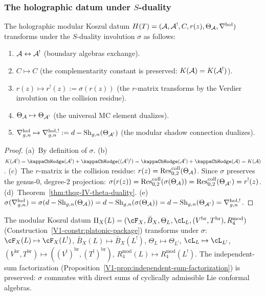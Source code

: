 \subsubsection{The holographic datum under $S$-duality}

\begin{proposition}
\label{prop:thqg-IV-holographic-datum}
The holographic modular Koszul datum
$H(T) = (\mathcal{A}, \mathcal{A}^!, C, r(z), \Theta_{\mathcal{A}}, \nabla^{\mathrm{hol}})$
transforms under the $S$-duality involution $\sigma$ as follows:
\begin{enumerate}[label=\textup{(\alph*)}]
\item $\mathcal{A} \leftrightarrow \mathcal{A}^!$ (boundary algebras exchange).
\item $C \mapsto C$ (the complementarity constant is preserved:
 $K(\mathcal{A}) = K(\mathcal{A}^!)$).
\item $r(z) \mapsto r^!(z) := \sigma(r(z))$ (the $r$-matrix
 transforms by the Verdier involution on the collision residue).
\item $\Theta_{\mathcal{A}} \mapsto \Theta_{\mathcal{A}^!}$ (the universal MC element
 dualizes).
\item $\nabla^{\mathrm{hol}}_{g,n} \mapsto \nabla^{\mathrm{hol},!}_{g,n}
 := d - \mathrm{Sh}_{g,n}(\Theta_{\mathcal{A}^!})$ (the modular shadow connection
 dualizes).
\end{enumerate}
\end{proposition}

\begin{proof}
(a)~By definition of $\sigma$.
(b)~$K(\cA^!) = \kappaChHodge(\cA^!) + \kappaChHodge((\cA^!)^!) = \kappaChHodge(\cA^!) + \kappaChHodge(\cA) = K(\cA)$.
(c)~The $r$-matrix is the collision residue:
$r(z) = \operatorname{Res}^{\mathrm{coll}}_{0,2}(\Theta_{\mathcal{A}})$.
Since $\sigma$ preserves the genus-$0$, degree-$2$ projection:
$\sigma(r(z)) = \operatorname{Res}^{\mathrm{coll}}_{0,2}(\sigma(\Theta_{\mathcal{A}}))
= \operatorname{Res}^{\mathrm{coll}}_{0,2}(\Theta_{\mathcal{A}^!}) = r^!(z)$.
(d)~Theorem~\ref{thm:thqg-IV-theta-duality}.
(e)~$\sigma(\nabla^{\mathrm{hol}}_{g,n})
= \sigma(d - \mathrm{Sh}_{g,n}(\Theta_{\mathcal{A}}))
= d - \mathrm{Sh}_{g,n}(\sigma(\Theta_{\mathcal{A}}))
= d - \mathrm{Sh}_{g,n}(\Theta_{\mathcal{A}^!})
= \nabla^{\mathrm{hol},!}_{g,n}$.
\end{proof}

\begin{remark}
The modular Koszul datum $\Pi_X(L) = (\cF_X, \bar{B}_X, \Theta_L, \cL_L,
(V^{\mathrm{br}}, T^{\mathrm{br}}), R_4^{\mathrm{mod}})$
(Construction~\ref{V1-constr:platonic-package}) transforms under $\sigma$:
$\cF_X(L) \mapsto \cF_X(L^!)$,
$\bar{B}_X(L) \mapsto \bar{B}_X(L^!)$,
$\Theta_L \mapsto \Theta_{L^!}$,
$\cL_L \mapsto \cL_{L^!}$,
$(V^{\mathrm{br}}, T^{\mathrm{br}}) \mapsto ((V^!)^{\mathrm{br}}, (T^!)^{\mathrm{br}})$,
$R_4^{\mathrm{mod}}(L) \mapsto R_4^{\mathrm{mod}}(L^!)$.
The independent-sum factorization
(Proposition~\ref{V1-prop:independent-sum-factorization}) is preserved:
$\sigma$ commutes with direct sums of cyclically admissible Lie
conformal algebras.
\end{remark}

